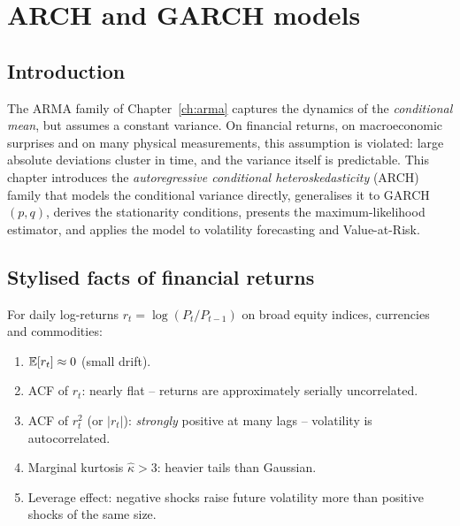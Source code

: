 
\chapter{ARCH and GARCH models}
\label{ch:arch-garch}

\section*{Introduction}

The ARMA family of Chapter~\ref{ch:arma} captures the dynamics of
the \emph{conditional mean}, but assumes a constant variance. On
financial returns, on macroeconomic surprises and on many physical
measurements, this assumption is violated: large absolute deviations
cluster in time, and the variance itself is predictable.
This chapter introduces the \emph{autoregressive conditional
heteroskedasticity} (ARCH) family that models the conditional
variance directly, generalises it to GARCH$(p, q)$, derives the
stationarity conditions, presents the maximum-likelihood estimator,
and applies the model to volatility forecasting and Value-at-Risk.

\section{Stylised facts of financial returns}
\label{sec:stylised}

\begin{rembox}
For daily log-returns $r_t = \log(P_t / P_{t-1})$ on broad equity
indices, currencies and commodities:
\begin{enumerate}
  \item $\mathbb{E}[r_t] \approx 0$ (small drift).
  \item ACF of $r_t$: nearly flat -- returns are approximately
        serially uncorrelated.
  \item ACF of $r_t^2$ (or $|r_t|$): \emph{strongly} positive at
        many lags -- volatility is autocorrelated.
  \item Marginal kurtosis $\widehat\kappa > 3$: heavier tails than
        Gaussian.
  \item Leverage effect: negative shocks raise future volatility
        more than positive shocks of the same size.
\end{enumerate}
\end{rembox}

